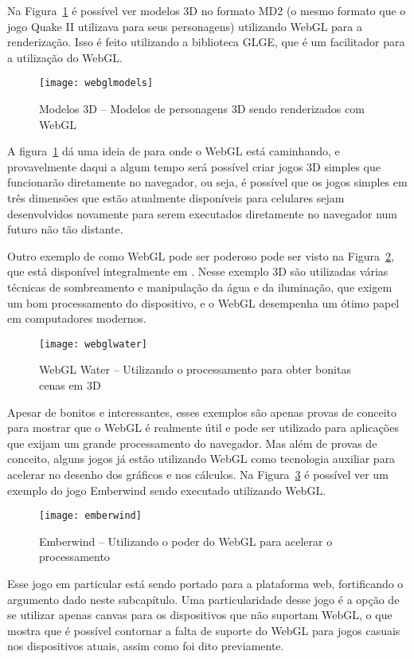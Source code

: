 Na Figura~\ref{img:webglmodels} é possível ver modelos 3D no formato
MD2 (o mesmo formato que o jogo Quake II utilizava para seus
personagens) utilizando WebGL para a renderização. Isso é feito utilizando a
biblioteca GLGE, que é um facilitador para a utilização do WebGL.

\begin{figure}[H]
  \centering
	\texttt{[image: webglmodels]}
  \caption{Modelos 3D {--} Modelos de personagens 3D sendo renderizados com WebGL}
  \label{img:webglmodels}
\end{figure}

A figura~\ref{img:webglmodels} dá uma ideia de para onde o WebGL está
caminhando, e provavelmente daqui a algum tempo será possível criar
jogos 3D simples que funcionarão diretamente no navegador, ou seja,
é possível que os jogos simples em três dimensões que estão atualmente
disponíveis para celulares sejam desenvolvidos novamente para
serem executados diretamente no navegador num futuro não tão distante.

Outro exemplo de como WebGL pode ser poderoso pode ser visto na
Figura~\ref{img:webglwater},
que está disponível integralmente em .
Nesse exemplo 3D são utilizadas várias técnicas de sombreamento e
manipulação da água e da iluminação, que exigem um bom processamento
do dispositivo, e o WebGL desempenha um ótimo papel em computadores
modernos.

\begin{figure}[H]
  \centering
	\texttt{[image: webglwater]}
  \caption{WebGL Water {--} Utilizando o processamento para obter
  bonitas cenas em 3D}
  \label{img:webglwater}
\end{figure}

Apesar de bonitos e interessantes, esses exemplos são apenas provas de
conceito para mostrar que o WebGL é realmente útil e pode ser
utilizado para aplicações que exijam um grande processamento do
navegador. Mas além de provas de conceito, alguns jogos já estão
utilizando WebGL como tecnologia auxiliar para acelerar no desenho dos
gráficos e nos cálculos.
Na Figura~\ref{img:emberwind} é possível ver um exemplo do jogo Emberwind
sendo executado utilizando WebGL.

\begin{figure}[H]
  \centering
	\texttt{[image: emberwind]}
  \caption{Emberwind {--} Utilizando o poder do WebGL para acelerar o processamento}
  \label{img:emberwind}
\end{figure}

Esse jogo em particular está sendo portado para a plataforma web,
fortificando o argumento dado neste subcapítulo. Uma particularidade
desse jogo é a opção de se utilizar apenas canvas para os dispositivos
que não suportam WebGL, o que mostra que é possível contornar a falta
de suporte do WebGL para jogos casuais nos dispositivos atuais, assim
como foi dito previamente.

\clearpage
